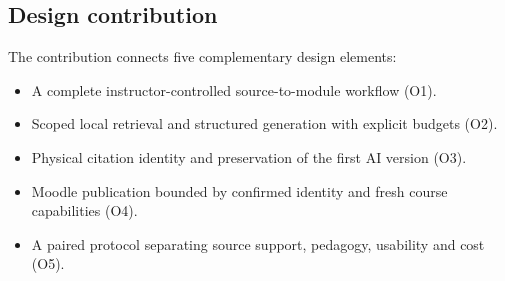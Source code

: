 \subsection{Design contribution}
The contribution connects five complementary design elements:
\begin{itemize}[leftmargin=*]
\item A complete instructor-controlled source-to-module workflow (O1).
\item Scoped local retrieval and structured generation with explicit budgets (O2).
\item Physical citation identity and preservation of the first AI version (O3).
\item Moodle publication bounded by confirmed identity and fresh course capabilities (O4).
\item A paired protocol separating source support, pedagogy, usability and cost (O5).
\end{itemize}
